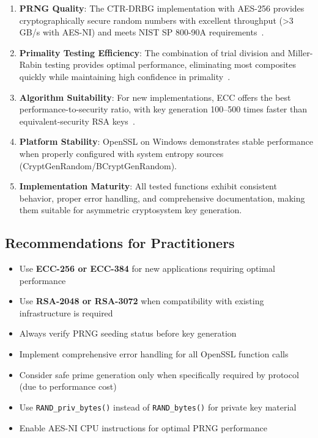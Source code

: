 \begin{enumerate}
    \item \textbf{PRNG Quality}: The CTR-DRBG implementation with AES-256 provides cryptographically secure random numbers with excellent throughput (>3 GB/s with AES-NI) and meets NIST SP 800-90A requirements~\cite{barker2015recommendation}.

    \item \textbf{Primality Testing Efficiency}: The combination of trial division and Miller-Rabin testing provides optimal performance, eliminating most composites quickly while maintaining high confidence in primality~\cite{crandall2005prime}.

    \item \textbf{Algorithm Suitability}: For new implementations, ECC offers the best performance-to-security ratio, with key generation 100--500 times faster than equivalent-security RSA keys~\cite{hankerson2006guide}.

    \item \textbf{Platform Stability}: OpenSSL on Windows demonstrates stable performance when properly configured with system entropy sources (CryptGenRandom/BCryptGenRandom).

    \item \textbf{Implementation Maturity}: All tested functions exhibit consistent behavior, proper error handling, and comprehensive documentation, making them suitable for asymmetric cryptosystem key generation.
\end{enumerate}

\subsection{Recommendations for Practitioners}

\begin{itemize}
    \item Use \textbf{ECC-256 or ECC-384} for new applications requiring optimal performance
    \item Use \textbf{RSA-2048 or RSA-3072} when compatibility with existing infrastructure is required
    \item Always verify PRNG seeding status before key generation
    \item Implement comprehensive error handling for all OpenSSL function calls
    \item Consider safe prime generation only when specifically required by protocol (due to performance cost)
    \item Use \texttt{RAND\_priv\_bytes()} instead of \texttt{RAND\_bytes()} for private key material
    \item Enable AES-NI CPU instructions for optimal PRNG performance
\end{itemize}

